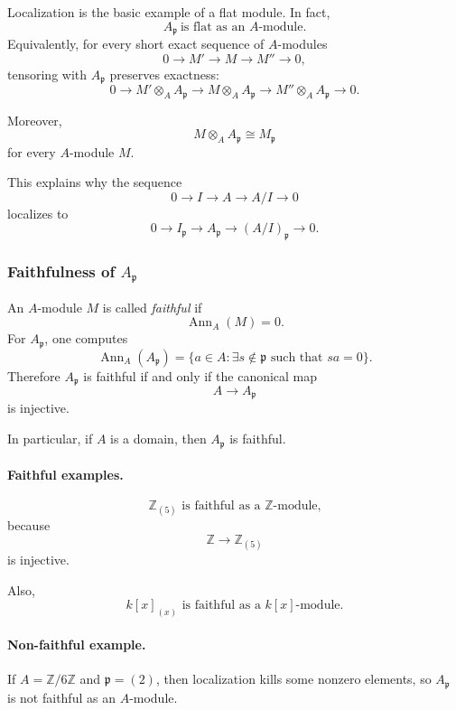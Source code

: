 \documentclass[12pt,a4paper]{article}
\theoremstyle{notespace}
\theoremstyle{definition}
\begin{document}
Localization is the basic example of a flat module. In fact,
\[
A_{\mathfrak p}\ \text{is flat as an }A\text{-module.}
\]
Equivalently, for every short exact sequence of \(A\)-modules
\[
0
\longrightarrow
M'
\longrightarrow
M
\longrightarrow
M''
\longrightarrow
0,
\]
tensoring with \(A_{\mathfrak p}\) preserves exactness:
\[
0
\longrightarrow
M'\otimes_A A_{\mathfrak p}
\longrightarrow
M\otimes_A A_{\mathfrak p}
\longrightarrow
M''\otimes_A A_{\mathfrak p}
\longrightarrow
0.
\]

Moreover,
\[
M\otimes_A A_{\mathfrak p}\cong M_{\mathfrak p}
\]
for every \(A\)-module \(M\).

This explains why the sequence
\[
0
\longrightarrow
I
\longrightarrow
A
\longrightarrow
A/I
\longrightarrow
0
\]
localizes to
\[
0
\longrightarrow
I_{\mathfrak p}
\longrightarrow
A_{\mathfrak p}
\longrightarrow
(A/I)_{\mathfrak p}
\longrightarrow
0.
\]

\subsubsection{Faithfulness of \(A_{\mathfrak p}\)}

An \(A\)-module \(M\) is called \emph{faithful} if
\[
\operatorname{Ann}_A(M)=0.
\]
For \(A_{\mathfrak p}\), one computes
\[
\operatorname{Ann}_A(A_{\mathfrak p})
=
\{a\in A:\exists s\notin \mathfrak p \text{ such that } sa=0\}.
\]
Therefore \(A_{\mathfrak p}\) is faithful if and only if the canonical map
\[
A\longrightarrow A_{\mathfrak p}
\]
is injective.

In particular, if \(A\) is a domain, then \(A_{\mathfrak p}\) is faithful.

\paragraph{Faithful examples.}
\[
\mathbb Z_{(5)} \text{ is faithful as a } \mathbb Z\text{-module,}
\]
because
\[
\mathbb Z\longrightarrow \mathbb Z_{(5)}
\]
is injective.

Also,
\[
k[x]_{(x)} \text{ is faithful as a } k[x]\text{-module.}
\]

\paragraph{Non-faithful example.}
If \(A=\mathbb Z/6\mathbb Z\) and \(\mathfrak p=(2)\), then localization kills some nonzero elements, so \(A_{\mathfrak p}\) is not faithful as an \(A\)-module.
\end{document}
